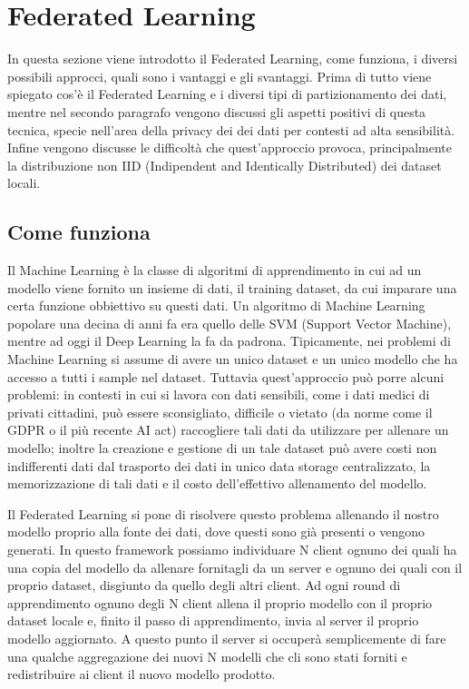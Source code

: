 \chapter{Federated Learning}
In questa sezione viene introdotto il Federated Learning, come funziona,
i diversi possibili approcci, quali sono i vantaggi e gli svantaggi.
Prima di tutto viene spiegato cos'è il Federated Learning e i diversi tipi
di partizionamento dei dati, mentre nel secondo paragrafo vengono discussi
gli aspetti positivi di questa tecnica, specie nell'area della privacy dei
dei dati per contesti ad alta sensibilità. Infine vengono discusse le
difficoltà che quest'approccio provoca, principalmente la distribuzione non
IID (Indipendent and Identically Distributed) dei dataset locali.

\section{Come funziona}
Il Machine Learning è la classe di algoritmi di apprendimento in cui ad un
modello viene fornito un insieme di dati, il training dataset, da cui
imparare una certa funzione obbiettivo su questi dati. Un algoritmo di 
Machine Learning popolare una decina di anni fa era quello delle SVM
(Support Vector Machine), mentre ad oggi il Deep Learning la fa da padrona.
Tipicamente, nei problemi di Machine Learning si assume di avere un unico
dataset e un unico modello che ha accesso a tutti i sample nel dataset.
Tuttavia quest'approccio può porre alcuni problemi: in contesti in cui si
lavora con dati sensibili, come i dati medici di privati cittadini, può 
essere sconsigliato, difficile o vietato (da norme come il GDPR o il più
recente AI act) raccogliere tali dati da utilizzare per allenare un modello;
inoltre la creazione e gestione di un tale dataset può avere costi non
indifferenti dati dal trasporto dei dati in unico data storage centralizzato,
la memorizzazione di tali dati e il costo dell'effettivo allenamento del
modello.

Il Federated Learning si pone di risolvere questo problema allenando il nostro
modello proprio alla fonte dei dati, dove questi sono già presenti o vengono
generati. In questo framework possiamo individuare N client ognuno dei quali
ha una copia del modello da allenare fornitagli da un server e ognuno dei quali
con il proprio dataset, disgiunto da quello degli altri client.
Ad ogni round di apprendimento ognuno degli N client allena il proprio modello 
con il proprio dataset locale e, finito il passo di apprendimento, invia al
server il proprio modello aggiornato. A questo punto il server si occuperà 
semplicemente di fare una qualche aggregazione dei nuovi N modelli che cli sono
stati forniti e redistribuire ai client il nuovo modello prodotto.

